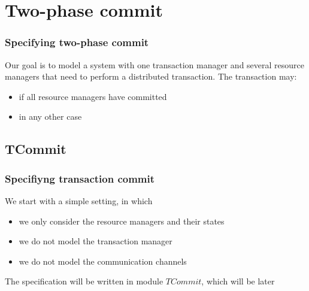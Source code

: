 \section[image=bgphoto_cut]{Two-phase commit}
\begin{frame}[plain]{}
    \sectionpage
\end{frame}

\begin{frame}
    \frametitle{Specifying two-phase commit}

    Our goal is to model a system with one \alert{transaction manager} and
    several \alert{resource managers} that need to perform a distributed
    transaction.
    The transaction may:
    \begin{itemize}
        \item {} if all resource managers have committed
        \item {} in any other case
    \end{itemize}

    \begin{center} 
    \end{center}
\end{frame}

\subsection{TCommit}
\begin{frame}
    \frametitle{Specifiyng transaction commit}
    We start with a simple setting, in which
    \begin{itemize}
        \item we only consider the resource managers and their states
        \item we do not model the transaction manager
        \item we do not model the communication channels
    \end{itemize}
    \pause
    The specification will be written in module $TCommit$, which will be
     later

    \begin{center}
        \begin{tlatex}
            \moduleRightDash
        \end{tlatex}
    \end{center}

\end{frame}

